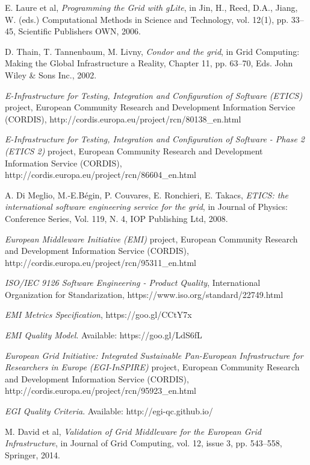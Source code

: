 \documentclass[journal]{IEEEtran}
\begin{document}
\begin{thebibliography}{1}
E. Laure et al, \emph{Programming the Grid with gLite}, in Jin, H., Reed, D.A.,
Jiang, W. (eds.) Computational Methods in Science and Technology, vol. 12(1),
pp. 33–45, Scientific Publishers OWN, 2006.

D. Thain, T. Tannenbaum, M. Livny, \emph{Condor and the grid}, in Grid
Computing: Making the Global Infrastructure a Reality, Chapter 11, pp. 63–70,
Eds. John Wiley \& Sons Inc., 2002.

\emph{E-Infrastructure for Testing, Integration and Configuration of Software
(ETICS)} project, European Community Research and Development Information
Service (CORDIS), http://cordis.europa.eu/project/rcn/80138\_en.html

\emph{E-Infrastructure for Testing, Integration and Configuration of Software -
Phase 2 (ETICS 2)} project, European Community Research and Development
Information Service (CORDIS),
http://cordis.europa.eu/project/rcn/86604\_en.html

A. Di Meglio, M.-E.Bégin, P. Couvares, E. Ronchieri, E. Takacs, \emph{ETICS:
the international software engineering service for the grid}, in Journal of
Physics: Conference Series, Vol. 119, N. 4, IOP Publishing Ltd, 2008.

\emph{European Middleware Initiative (EMI)} project, European Community
Research and Development Information Service (CORDIS),
http://cordis.europa.eu/project/rcn/95311\_en.html

\emph{ISO/IEC 9126 Software Engineering - Product Quality}, International
Organization for Standarization, https://www.iso.org/standard/22749.html

\emph{EMI Metrics Specification}, https://goo.gl/CCtY7x


\emph{EMI Quality Model}. Available: https://goo.gl/LdS6fL

\emph{European Grid Initiative: Integrated Sustainable Pan-European
Infrastructure for Researchers in Europe (EGI-InSPIRE)} project, European
Community Research and Development Information Service (CORDIS),
http://cordis.europa.eu/project/rcn/95923\_en.html

\emph{EGI Quality Criteria}. Available: http://egi-qc.github.io/

M. David et al, \emph{Validation of Grid Middleware for the European Grid
Infrastructure}, in Journal of Grid Computing, vol. 12, issue 3, pp. 543–558,
Springer, 2014.


\end{thebibliography}
\end{document}
